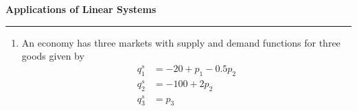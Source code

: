 \documentclass[12pt]{article}
\begin{document}
\begin{center}
{\bf \Large Applications of Linear Systems}
\vspace{0.2cm}
\hrule
\end{center}

\begin{enumerate}
	\item An economy has three markets with supply and demand functions for three goods given by
	\begin{align*}
		q_1^s&= -20 + p_1 -0.5p_2\\
		q_2^s&= -100 + 2p_2\\
		q_3^s&= p_3
	\end{align*}
	\begin{align*}
		
	\end{align*}
\end{enumerate}
\end{document}
